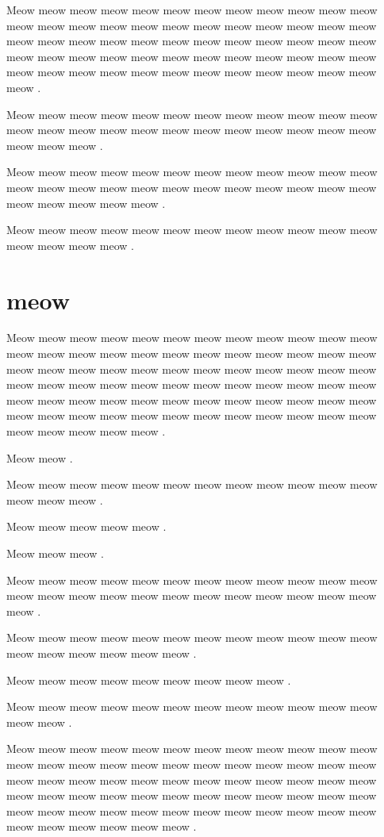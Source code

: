 \documentclass[12pt, a5paper, openany]{book}
\begin{document}
Meow meow meow meow meow meow meow meow meow meow meow meow meow meow meow meow meow meow meow meow meow meow meow meow meow meow meow meow meow meow meow meow meow meow meow meow meow meow meow meow meow meow meow meow meow meow meow meow meow meow meow meow meow meow meow meow meow meow meow meow meow .

Meow meow meow meow meow meow meow meow meow meow meow meow meow meow meow meow meow meow meow meow meow meow meow meow meow meow meow .

Meow meow meow meow meow meow meow meow meow meow meow meow meow meow meow meow meow meow meow meow meow meow meow meow meow meow meow meow meow .

Meow meow meow meow meow meow meow meow meow meow meow meow meow meow meow meow .



\chapter{meow }Meow meow meow meow meow meow meow meow meow meow meow meow meow meow meow meow meow meow meow meow meow meow meow meow meow meow meow meow meow meow meow meow meow meow meow meow meow meow meow meow meow meow meow meow meow meow meow meow meow meow meow meow meow meow meow meow meow meow meow meow meow meow meow meow meow meow meow meow meow meow meow meow meow meow meow meow meow .

Meow meow .

Meow meow meow meow meow meow meow meow meow meow meow meow meow meow meow .

Meow meow meow meow meow .

Meow meow meow .

Meow meow meow meow meow meow meow meow meow meow meow meow meow meow meow meow meow meow meow meow meow meow meow meow meow .

Meow meow meow meow meow meow meow meow meow meow meow meow meow meow meow meow meow meow .

Meow meow meow meow meow meow meow meow meow .

Meow meow meow meow meow meow meow meow meow meow meow meow meow meow .

Meow meow meow meow meow meow meow meow meow meow meow meow meow meow meow meow meow meow meow meow meow meow meow meow meow meow meow meow meow meow meow meow meow meow meow meow meow meow meow meow meow meow meow meow meow meow meow meow meow meow meow meow meow meow meow meow meow meow meow meow meow meow meow meow meow meow .
\end{document}
